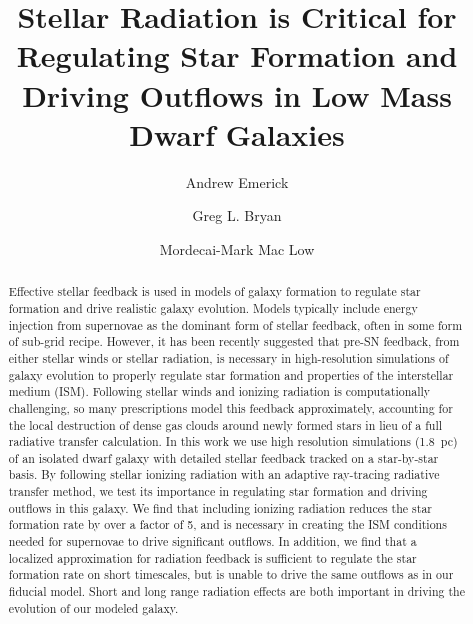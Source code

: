 \documentclass[twocolumn]{aastex62}
\begin{document}
\title{Stellar Radiation is Critical for Regulating Star Formation and Driving Outflows in Low Mass Dwarf Galaxies}


\author{Andrew Emerick}

\author{Greg L. Bryan}

\author{Mordecai-Mark Mac Low}

\nocollaboration



\begin{abstract}
%
%
%
%
Effective stellar feedback is used in models of galaxy formation to regulate star formation and drive realistic galaxy evolution. Models typically include energy injection from supernovae as the dominant form of stellar feedback, often in some form of sub-grid recipe. However, it has been recently suggested that pre-SN feedback, from either stellar winds or stellar radiation, is necessary in high-resolution simulations of galaxy evolution to properly regulate star formation and properties of the interstellar medium (ISM). Following stellar winds and ionizing radiation is computationally challenging, so many prescriptions model this feedback approximately, accounting for the local destruction of dense gas clouds around newly formed stars in lieu of a full radiative transfer calculation. In this work we use high resolution simulations (1.8~pc) of an isolated dwarf galaxy with detailed stellar feedback tracked on a star-by-star basis. By following stellar ionizing radiation with an adaptive ray-tracing radiative transfer method, we test its importance in regulating star formation and driving outflows in this galaxy. We find that including ionizing radiation reduces the star formation rate by over a factor of 5, and is necessary in creating the ISM conditions needed for supernovae to drive significant outflows. In addition, we find that a localized approximation for radiation feedback is sufficient to regulate the star formation rate on short timescales, but is unable to drive the same outflows as in our fiducial model. Short and long range radiation effects are both important in driving the evolution of our modeled galaxy.
\end{abstract}
\end{document}
